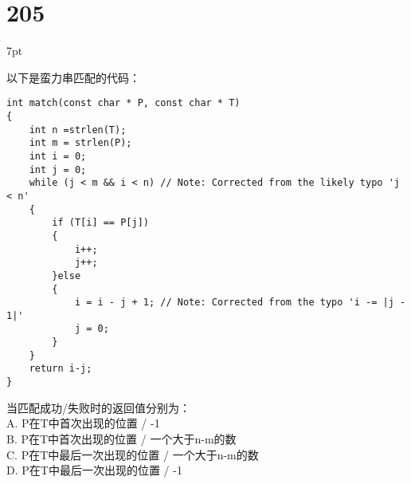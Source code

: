 \documentclass[UTF8]{report}
\theoremstyle{MyLineTheoremStyle} %
\theoremstyle{MyBlockTheoremStyle} %
\theoremstyle{MySubsubsectionStyle} %
\newenvironment{graybox}{%
        \def\FrameCommand{%
        \hspace{1pt}%
        {\color{gray}\small \vrule width 2pt}%
        {\color{graybox_color}\vrule width 4pt}%
        \colorbox{graybox_color}%
        }%
        \MakeFramed{\advance\hsize-\width\FrameRestore}%
        \noindent\hspace{-4.55pt}%
        \begin{adjustwidth}{}{7pt}%
        \vspace{2pt}\vspace{2pt}%
        }
        {%
        \vspace{2pt}\end{adjustwidth}\endMakeFramed%
        }
\begin{document}
\section*{205}
\begin{graybox}
以下是蛮力串匹配的代码：
\begin{verbatim}
int match(const char * P, const char * T)
{
    int n =strlen(T);
    int m = strlen(P);
    int i = 0;
    int j = 0;
    while (j < m && i < n) // Note: Corrected from the likely typo 'j < n'
    {
        if (T[i] == P[j])
        {
            i++;
            j++;
        }else
        {
            i = i - j + 1; // Note: Corrected from the typo 'i -= |j - 1|'
            j = 0;
        }
    }
    return i-j;
}
\end{verbatim}
当匹配成功/失败时的返回值分别为：\\
A. P在T中首次出现的位置 / -1\\
B. P在T中首次出现的位置 / 一个大于n-m的数\\
C. P在T中最后一次出现的位置 / 一个大于n-m的数\\
D. P在T中最后一次出现的位置 / -1
\end{graybox}
\end{document}
